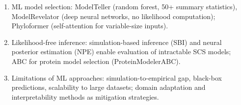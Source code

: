 \begin{revise}
\begin{enumerate}[itemsep=0pt, topsep=0pt, parsep=0pt]
    \item ML model selection: ModelTeller (random forest, 50+ summary statistics), ModelRevelator (deep neural networks, no likelihood computation); Phyloformer (self-attention for variable-size inputs).
    \item Likelihood-free inference: simulation-based inference (SBI) and neural posterior estimation (NPE) enable evaluation of intractable SCS models; ABC for protein model selection (ProteinModelerABC).
    \item Limitations of ML approaches: simulation-to-empirical gap, black-box predictions, scalability to large datasets; domain adaptation and interpretability methods as mitigation strategies.
\end{enumerate}
\end{revise}

\clearpage

\printbibliography[heading=subbibliography,title={References}]


